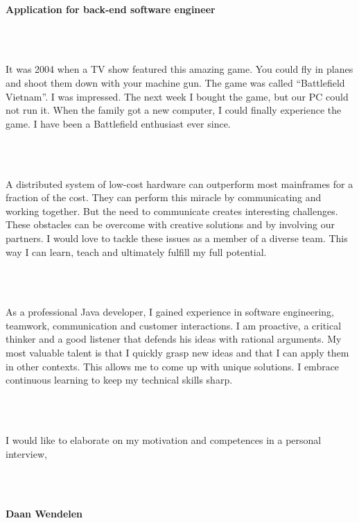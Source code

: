 \documentclass[11pt,a4paper,arial]{moderncv}        %
\begin{document}
\date{2017-05-01}

\makelettertitle

~\\

\textbf {Application for back-end software engineer}

~\\
~

It was 2004 when a TV show featured this amazing game. You could fly in planes and shoot them down with your machine gun. The game was
called ``Battlefield Vietnam''. I was impressed. The next week I bought the game, but our PC could not run it.
When the family got a new computer, I could finally experience the game. I have been a Battlefield enthusiast ever since.

~\\
~

A distributed system of low-cost hardware can outperform most mainframes for a fraction of the cost.
They can perform this miracle by communicating and working together. But the need to communicate creates interesting challenges.
These obstacles can be overcome with creative solutions and by involving our partners. I would love to tackle these issues
as a member of a diverse team. This way I can learn, teach and ultimately fulfill my full potential.

~\\
~

As a professional Java developer, I gained experience in software engineering, teamwork, communication and customer interactions.
I am proactive, a critical thinker and a good listener that defends his ideas with rational arguments.
My most valuable talent is that I quickly grasp new ideas and that I can apply them in other contexts. This allows me to come up with unique solutions.
I embrace continuous learning to keep my technical skills sharp.

~\\
~

I would like to elaborate on my motivation and competences in a personal interview,

~\\
~

\textbf {Daan Wendelen}

\makeletterclosing
\end{document}

